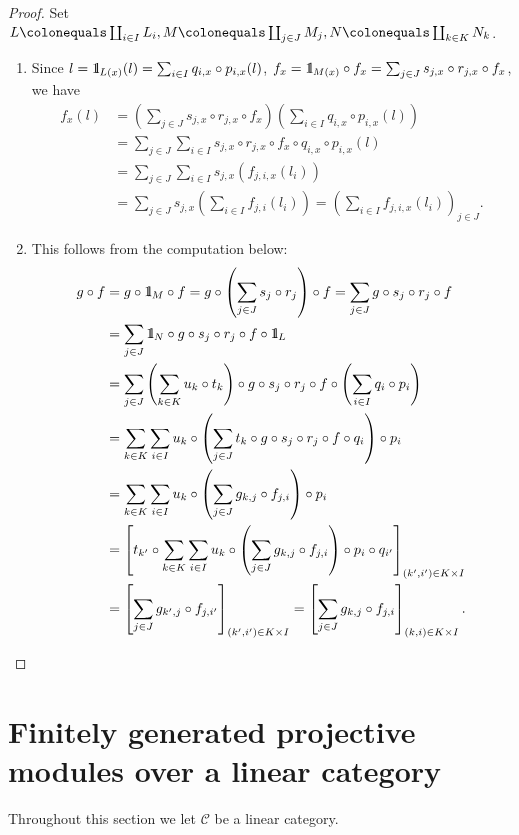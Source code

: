 \documentclass{surv-l}
\numberwithin{equation}{chapter}
\numberwithin{figure}{chapter}
\theoremstyle{plain}
\theoremstyle{definition}
\theoremstyle{remark}
\newcommand{\id}{1\kern-.25em{\text{{\rm l}}}}
\begin{document}
\begin{proof}
Set $L\colonequals  \coprod_{i\in I}L_i, M\colonequals  \coprod_{j\in J}M_j, N\colonequals  \coprod_{k\in K}N_k$.
\begin{enumerate}[wide]
\item Since $l = \id_{L(x)}(l) = \sum_{i\in I} q_{i,x} \circ p_{i,x}(l)$,
$f_{x} = \id_{M(x)}\circ f_x = \sum_{j\in J} s_{j,x} \circ r_{j,x} \circ f_x$, we have
\[
\begin{aligned}
f_x(l) &= \left(\sum_{j\in J} s_{j,x} \circ r_{j,x} \circ f_x\right)\left(\sum_{i\in I}q_{i,x} \circ p_{i,x}(l)\right)\\
&=\sum_{j\in J} \sum_{i\in I} s_{j,x} \circ r_{j,x} \circ f_x \circ q_{i,x} \circ p_{i,x}(l)\\
&=\sum_{j\in J} \sum_{i\in I} s_{j,x}(f_{j,i,x}(l_i))\\
&=\sum_{j\in J}s_{j,x}\left( \sum_{i\in I} f_{j,i}(l_i)\right)
= \left(\sum_{i\in I}f_{j,i,x}(l_i)\right)_{j\in J}.
\end{aligned}
\]

\item
This follows from the computation below:
\[
\begin{aligned}
g \circ f &= g \circ \id_M \circ f
= g \circ \left(\sum_{j\in J} s_j \circ r_j \right) \circ f
= \sum_{j\in J}g \circ s_j \circ r_j \circ f\\
&= \sum_{j\in J}\id_N \circ g \circ s_j \circ r_j \circ f \circ \id_L\\
&= \sum_{j\in J}\left(\sum_{k\in K} u_k \circ t_k \right) \circ g \circ s_j \circ r_j \circ f \circ
\left(\sum_{i\in I} q_i \circ p_i \right)\\
&= \sum_{k\in K}\sum_{i\in I}u_k \circ \left(\sum_{j\in J}
t_k \circ g \circ s_j \circ r_j \circ f \circ  q_i \right)\circ p_i\\
&=\sum_{k\in K}\sum_{i\in I}u_k \circ \left(\sum_{j\in J}
g_{k,j}\circ f_{j,i} \right)\circ p_i\\
&= \left[t_{k'} \circ \sum_{k\in K}\sum_{i\in I}u_k \circ \left(\sum_{j\in J}
g_{k,j}\circ f_{j,i} \right)\circ p_i \circ q_{i'}  \right]_{(k',i')\in K\times I}\\
&=  \left[\sum_{j \in J} g_{k',j}\circ f_{j,i'}\right]_{(k',i')\in K\times I}
= \left[\sum_{j \in J} g_{k,j}\circ f_{j,i}\right]_{(k,i)\in K\times I}.
\end{aligned}
\]
\end{enumerate}
\end{proof}

\section[Finitely generated projective modules]{Finitely generated projective modules over a linear category}\label{sec:fg-proj-lincat}
Throughout this section we let ${\mathcal{C}}$ be a linear category.
\end{document}
